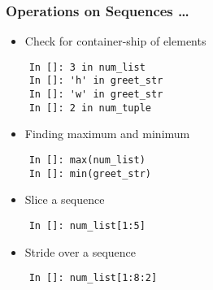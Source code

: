 \begin{frame}[fragile]
  \frametitle{Operations on Sequences \ldots}
  \begin{itemize}
  \item Check for container-ship of  elements
  \end{itemize}
  \begin{lstlisting}
    In []: 3 in num_list
    In []: 'h' in greet_str
    In []: 'w' in greet_str
    In []: 2 in num_tuple
  \end{lstlisting}
  \begin{itemize}
  \item Finding maximum and minimum 
  \end{itemize}
  \begin{lstlisting}
    In []: max(num_list)
    In []: min(greet_str)
  \end{lstlisting}
  \begin{itemize}
  \item Slice a sequence
  \end{itemize}
  \begin{lstlisting}
    In []: num_list[1:5]
  \end{lstlisting}
  \begin{itemize}
  \item Stride over a sequence
  \end{itemize}
  \begin{lstlisting}
    In []: num_list[1:8:2]
  \end{lstlisting}
\end{frame}

